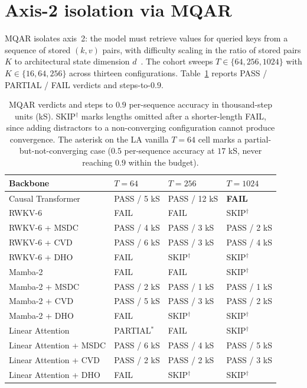 \section{Axis-2 isolation via MQAR}\label{sec:experiments:mqar}

MQAR isolates axis~2: the model must retrieve values for queried
keys from a sequence of stored $(k, v)$ pairs, with difficulty
scaling in the ratio of stored pairs $K$ to architectural state
dimension $d$~\cite{arora2023zoology}. The cohort sweeps
$T \in \{64, 256, 1024\}$ with $K \in \{16, 64, 256\}$ across
thirteen configurations. Table~\ref{tab:results:mqar-cohort}
reports PASS / PARTIAL / FAIL verdicts and steps-to-$0.9$.

\begin{table}[!htbp]
\centering
\small
\caption[MQAR verdicts]{MQAR verdicts and steps to $0.9$
per-sequence accuracy in thousand-step units (kS).
SKIP$^{\dagger}$ marks lengths omitted after a shorter-length
FAIL, since adding distractors to a non-converging configuration
cannot produce convergence. The asterisk on the LA vanilla
$T = 64$ cell marks a partial-but-not-converging case
($0.5$ per-sequence accuracy at $17$ kS, never reaching $0.9$
within the budget).}
\label{tab:results:mqar-cohort}
\setlength{\tabcolsep}{6pt}
\renewcommand{\arraystretch}{1.15}
\begin{tabularx}{\linewidth}{@{}p{5cm} X X X@{}}
\toprule
\textbf{Backbone} & \textbf{$T = 64$} & \textbf{$T = 256$} & \textbf{$T = 1024$} \\
\midrule
Causal Transformer       & PASS / 5 kS  & PASS / 12 kS & \textbf{FAIL} \\
\addlinespace
RWKV-6                   & FAIL          & FAIL          & SKIP$^{\dagger}$ \\
RWKV-6 + MSDC            & PASS / 4 kS  & PASS / 3 kS  & PASS / 2 kS \\
RWKV-6 + CVD             & PASS / 6 kS  & PASS / 3 kS  & PASS / 4 kS \\
RWKV-6 + DHO             & FAIL          & SKIP$^{\dagger}$ & SKIP$^{\dagger}$ \\
\addlinespace
Mamba-2                  & FAIL          & FAIL          & SKIP$^{\dagger}$ \\
Mamba-2 + MSDC           & PASS / 2 kS  & PASS / 1 kS  & PASS / 1 kS \\
Mamba-2 + CVD            & PASS / 5 kS  & PASS / 3 kS  & PASS / 2 kS \\
Mamba-2 + DHO            & FAIL          & SKIP$^{\dagger}$ & SKIP$^{\dagger}$ \\
\addlinespace
Linear Attention         & PARTIAL$^{\ast}$ & FAIL          & SKIP$^{\dagger}$ \\
Linear Attention + MSDC  & PASS / 6 kS  & PASS / 4 kS  & PASS / 5 kS \\
Linear Attention + CVD   & PASS / 2 kS  & PASS / 2 kS  & PASS / 3 kS \\
Linear Attention + DHO   & FAIL          & SKIP$^{\dagger}$ & SKIP$^{\dagger}$ \\
\bottomrule
\end{tabularx}
\end{table}


